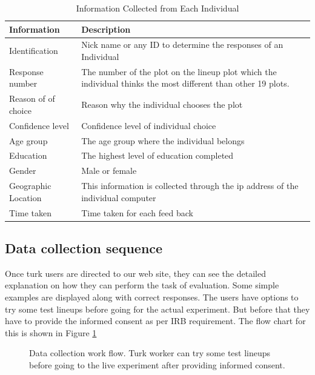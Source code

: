 \documentclass[11pt]{article}
\begin{document}
\begin{table}[hbtp]
\caption{Information Collected from Each Individual}
\centering 
\begin{tabular}{lp{8cm}} 
\hline
Information &  Description \\ %
\hline
Identification & Nick name or any ID to determine the responses of an Individual \\
Response number & The number of the plot on the lineup plot which the individual thinks the most different than other 19 plots.\\ 
Reason of of choice & Reason why the individual chooses the plot \\
Confidence level & Confidence level of individual choice \\ 
Age group& The age group where the individual belongs \\
Education & The highest level of education completed \\
Gender & Male or female \\
Geographic Location & This information is collected through the ip address of the individual computer \\ 
Time taken & Time taken for each feed back\\
\hline
\end{tabular}
\label{tbl:data_info}
\end{table}	


\subsection{Data collection sequence} Once turk users are directed to our web site, they can see the detailed explanation on how they can perform the task of evaluation. Some simple examples are displayed along with correct responses. The users have options to try some test lineups before going for the actual experiment. But before that they have to provide the informed consent as per IRB requirement. The flow chart for this is shown in Figure \ref{fig:turk_data_flow}

\begin{figure}[hbtp]
   \centering
       \caption{Data collection work flow. Turk worker can try some test lineups before going to the live experiment after providing informed consent.}
       \label{fig:turk_data_flow}
\end{figure}
\end{document}
